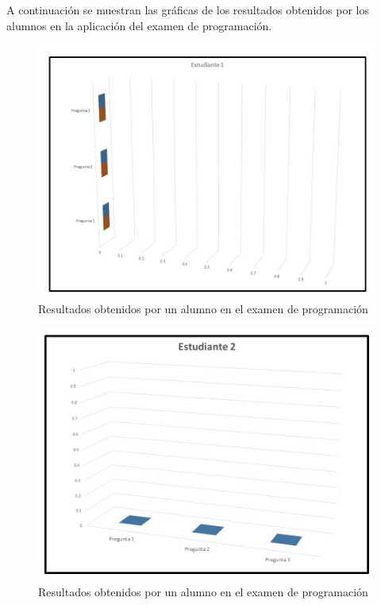 \documentclass[12pt] {report}
\begin{document}
A continuación se muestran las gráficas de los resultados obtenidos por los alumnos en la aplicación del examen de programación.\\
\begin{figure}[H]
\centering 
\includegraphics[scale=.4]{PEstudiante1.JPG}
\caption{Resultados obtenidos por un alumno en el examen de programación}
\end{figure}

\begin{figure}[H]
\centering 
\includegraphics[scale=.4]{PEstudiante2.JPG}
\caption{Resultados obtenidos por un alumno en el examen de programación}
\end{figure}
\end{document}
